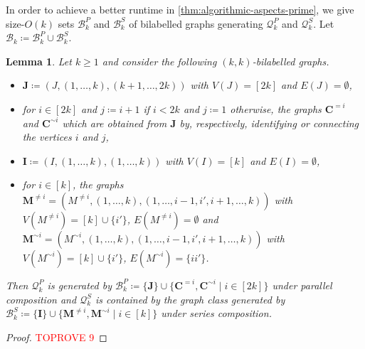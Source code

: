 \documentclass[11pt,a4paper]{article}
\theoremstyle{plain}
\newtheorem{lem}[thm]{Lemma}
\theoremstyle{remark}
\theoremstyle{definition}
\begin{document}
In order to achieve a better runtime in \cref{thm:algorithmic-aspects-prime}, we give size-$O(k)$ sets $\mathcal{B}_k^P$ and $\mathcal{B}_k^S$ of bilabelled graphs generating $\mathcal{Q}_k^P$ and $\mathcal{Q}_k^S$.
Let $\mathcal{B}_k \coloneqq \mathcal{B}_k^P \cup \mathcal{B}_k^S$.
\begin{lem} \label{lem:basal-graphs}
	Let $k \geq 1$ and consider the following $(k,k)$-bilabelled graphs.
	\begin{itemize}
		\item $\boldsymbol{J} \coloneqq (J, (1, \dots, k), (k+1, \dots, 2k))$ with $V(J) = [2k]$ and $E(J) = \emptyset$,
		\item for $i \in [2k]$ and $j \coloneqq i+1$ if $i < 2k$ and $j \coloneqq 1$ otherwise, the graphs $\boldsymbol{C}^{=i}$ and $\boldsymbol{C}^{\sim i}$ which are obtained from $\boldsymbol{J}$ by, respectively, identifying or connecting the vertices $i$ and $j$,
		\item $\boldsymbol{I} \coloneqq (I, (1, \dots, k), (1, \dots, k))$ with $V(I) = [k]$ and $E(I) = \emptyset$,
		\item for $i \in [k]$, the graphs $\boldsymbol{M}^{\neq i} = (M^{ \neq i}, (1, \dots, k), (1, \dots, i-1, i', i+1, \dots,k))$ with $V(M^{\neq i}) = [k] \cup \{i'\}$, $E(M^{\neq i}) = \emptyset$ and $\boldsymbol{M}^{\sim i} = (M^{\sim i}, (1, \dots, k), (1, \dots, i-1, i', i+1, \dots, k))$ with $V(M^{\sim i}) = [k] \cup \{i'\}$, $E(M^{\sim i}) = \{ii'\}$.
	\end{itemize}
	Then $\mathcal{Q}_k^P$ is generated by $\mathcal{B}_k^P \coloneqq \{\boldsymbol{J}\} \cup \{\boldsymbol{C}^{=i}, \boldsymbol{C}^{\sim i} \mid i \in [2k]\}$ under parallel composition
	and $\mathcal{Q}_k^S$ is contained by the graph class generated by $\mathcal{B}_k^S \coloneqq \{\boldsymbol{I}\} \cup \{\boldsymbol{M}^{\neq i}, \boldsymbol{M}^{\sim i} \mid i \in [k]\}$ under series composition.
\end{lem}
\begin{proof}\textcolor{red}{TOPROVE 9}\end{proof}
\end{document}

